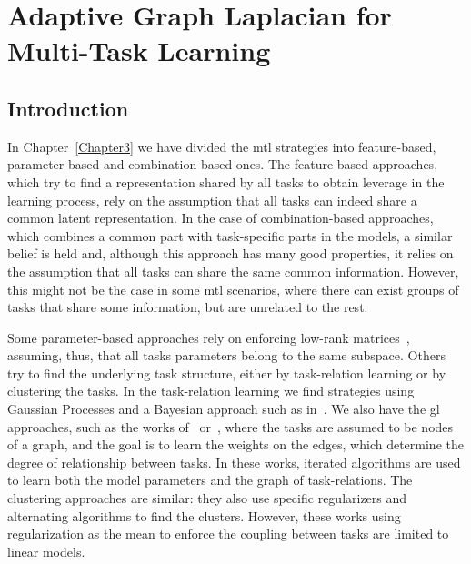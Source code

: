 
\chapter{Adaptive Graph Laplacian for Multi-Task Learning} %
\label{Chapter5}

{\bf \small{

    }}

\section{Introduction}
In Chapter~\ref{Chapter3} we have divided the \acrfull{mtl} strategies into feature-based, parameter-based and combination-based ones.
The feature-based approaches, which try to find a representation shared by all tasks to obtain leverage in the learning process, rely on the assumption that all tasks can indeed share a common latent representation.
In the case of combination-based approaches, which combines a common part with task-specific parts in the models, a similar belief is held and, although this approach has many good properties, it relies on the assumption that all tasks can share the same common information.
However, this might not be the case in some \acrshort{mtl} scenarios, where there can exist groups of tasks that share some information, but are unrelated to the rest.

%
%
Some parameter-based approaches rely on enforcing low-rank matrices~\citep{AndoZ05,ChenTLY09,PongTJY10}, assuming, thus, that all tasks parameters belong to the same subspace.
Others try to find the underlying task structure, either by task-relation learning or by clustering the tasks. In the task-relation learning we find strategies using Gaussian Processes and a Bayesian approach such as in~\citet{BonillaCW07,ZhangY10}. We also have the \acrfull{gl} approaches, such as the works of~\citet{EvgeniouMP05} or~\citet{argyriou2013learning}, where the tasks are assumed to be nodes of a graph, and the goal is to learn the weights on the edges, which determine the degree of relationship between tasks.
In these works, iterated algorithms are used to learn both the model parameters and the graph of task-relations.
The clustering approaches are similar: they also use specific regularizers and alternating algorithms to find the clusters.
However, these works using regularization as the mean to enforce the coupling between tasks are limited to linear models.

